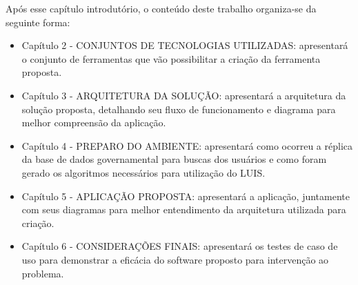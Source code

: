 Após esse capítulo introdutório, o conteúdo deste trabalho organiza-se da seguinte forma:
\begin{itemize}
	\item Capítulo 2 - \uppercase{Conjuntos de tecnologias utilizadas}: apresentará o conjunto de ferramentas que vão possibilitar a criação da ferramenta proposta.
	\item Capítulo 3 - \uppercase{Arquitetura da solução}: apresentará a arquitetura da solução proposta, detalhando seu fluxo de funcionamento e diagrama para melhor compreensão da aplicação.
	\item Capítulo 4 - \uppercase{Preparo do ambiente}: apresentará como ocorreu a réplica da base de dados governamental para buscas dos usuários e como foram gerado os algoritmos necessários para utilização do LUIS.
	\item Capítulo 5 - \uppercase{Aplicação proposta}: apresentará a aplicação, juntamente com seus diagramas para melhor entendimento da arquitetura utilizada para criação.
	\item Capítulo 6 - \uppercase{Considerações Finais}: apresentará os testes de caso de uso para demonstrar a eficácia do software proposto para intervenção ao problema.
\end{itemize}
